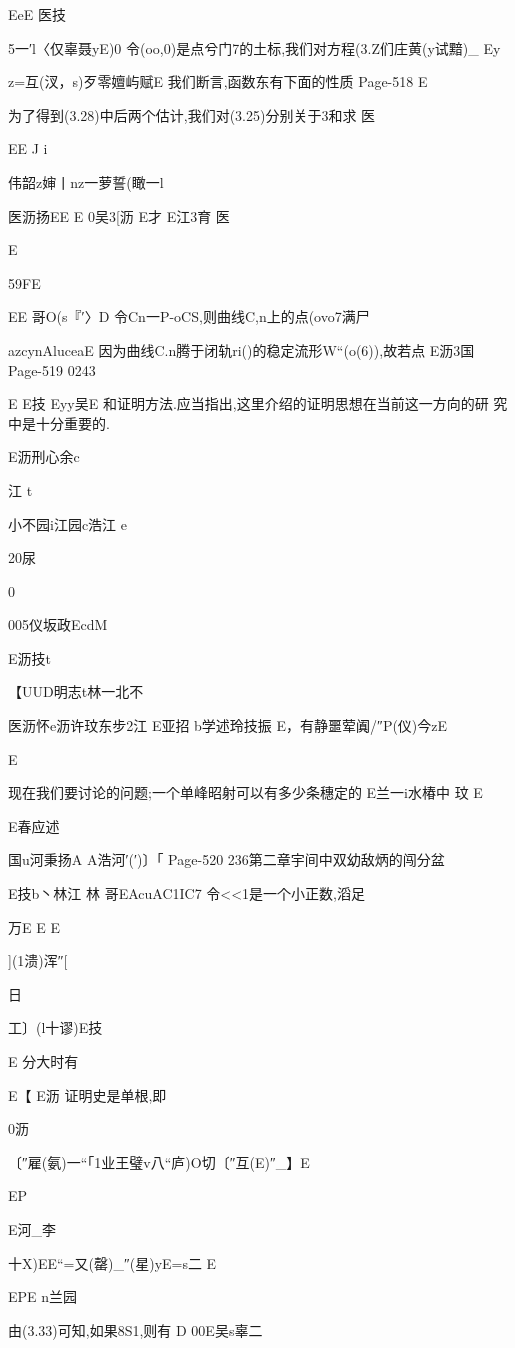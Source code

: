 {{{{EeE
医技

5一′l〈仅辜聂yE)0
令(oo,0)是点兮门7的土标,我们对方程(3.Z们庄黄(y试黯)_
Ey

z=互(汊，s)歹零嬗屿赋E
我们断言,函数东有下面的性质
Page-518
E

为了得到(3.28)中后两个估计,我们对(3.25)分别关于3和求
医

EE
J
i

伟韶z婶丨nz一萝誓(瞰一l

医沥扬EE
E
0吴3[沥
E才
E江3育
医

E

59FE

EE
哥O(s『′〉D
令Cn一P-oCS,则曲线C,n上的点(ovo7满尸

azcynAluceaE
因为曲线C.n腾于闭轨ri()的稳定流形W“(o(6)),故若点
E沥3国
Page-519
0243

E
E技
Eyy吴E
和证明方法.应当指出,这里介绍的证明思想在当前这一方向的研
究中是十分重要的.

E沥刑心余c

江
t

小不园i江园c浩江
e

20尿

0

005仪坂政EcdM

E沥技t

【UUD明志t林一北不

医沥怀e沥许玟东步2江
E亚招
b学述玲技振
E，有静噩荤阗/″P(仪)今zE

E

现在我们要讨论的问题;一个单峰昭射可以有多少条穗定的
E兰一i水椿中
玟
E

E春应述

国u河秉扬A
A浩河′(′)〕「
Page-520
236第二章宇间中双幼敌炳的闯分盆

E技b丶林江
林
哥EAcuAC1IC7
令<<1是一个小正数,滔足

万E
E
E

](1溃)浑″[

日

工〕(l十谬)E技

E
分大时有

E【
E沥
证明史是单根,即

0沥

〔″雇(氨)一“「1业王璧v八“庐)O切〔″互(E)″_】E

EP

E河_李

十X)EE“=又(罄)_″(星)yE=s二
E

EPE
n兰园

由(3.33)可知,如果8S1,则有
D
00E吴s辜二

}}}}
